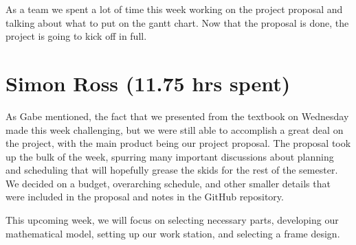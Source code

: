 \documentclass[12pt, titlepage]{article}
\begin{document}
	As a team we spent a lot of time this week working on the project proposal and talking about what to put on the gantt chart. Now that the proposal is done, the project is going to kick off in full.

\section*{Simon Ross (11.75 hrs spent)}

As Gabe mentioned, the fact that we presented from the textbook on Wednesday made this week challenging, but we were still able to accomplish a great deal on the project, with the main product being our project proposal. The proposal took up the bulk of the week, spurring many important discussions about planning and scheduling that will hopefully grease the skids for the rest of the semester. We decided on a budget, overarching schedule, and other smaller details that were included in the proposal and notes in the GitHub repository.

This upcoming week, we will focus on selecting necessary parts, developing our mathematical model, setting up our work station, and selecting a frame design.
\end{document}
